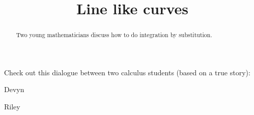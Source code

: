 \documentclass{ximera}
\title[Break-Ground:]{Line like curves}
\begin{document}
\begin{abstract}
Two young mathematicians discuss how to do integration by
substitution.
\end{abstract}
\maketitle

Check out this dialogue between two calculus students (based on a true
story):

\begin{dialogue}
\item[Devyn] 
\item[Riley] 
\end{dialogue}

\begin{problem}
\end{problem}


\end{document}
